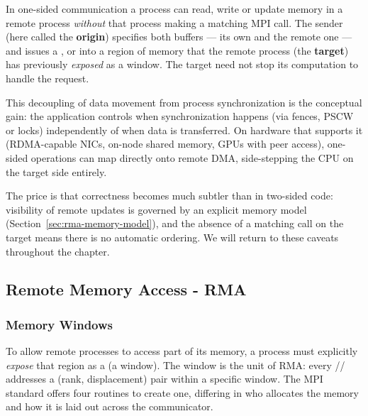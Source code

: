 In one-sided communication a process can read, write or update memory in a remote process \emph{without} that process making a matching MPI call. The sender (here called the \textbf{origin}) specifies both buffers --- its own and the remote one --- and issues a ,  or  into a region of memory that the remote process (the \textbf{target}) has previously \emph{exposed} as a window. The target need not stop its computation to handle the request.

This decoupling of data movement from process synchronization is the conceptual gain: the application controls when synchronization happens (via fences, PSCW or locks) independently of when data is transferred. On hardware that supports it (RDMA-capable NICs, on-node shared memory, GPUs with peer access), one-sided operations can map directly onto remote DMA, side-stepping the CPU on the target side entirely.

The price is that correctness becomes much subtler than in two-sided code: visibility of remote updates is governed by an explicit memory model (Section~\ref{sec:rma-memory-model}), and the absence of a matching call on the target means there is no automatic ordering. We will return to these caveats throughout the chapter.

\subsection{Remote Memory Access - RMA}

\subsubsection{Memory Windows}

To allow remote processes to access part of its memory, a process must explicitly \emph{expose} that region as a  (a window). The window is the unit of RMA: every // addresses a (rank, displacement) pair within a specific window. The MPI standard offers four routines to create one, differing in who allocates the memory and how it is laid out across the communicator.

